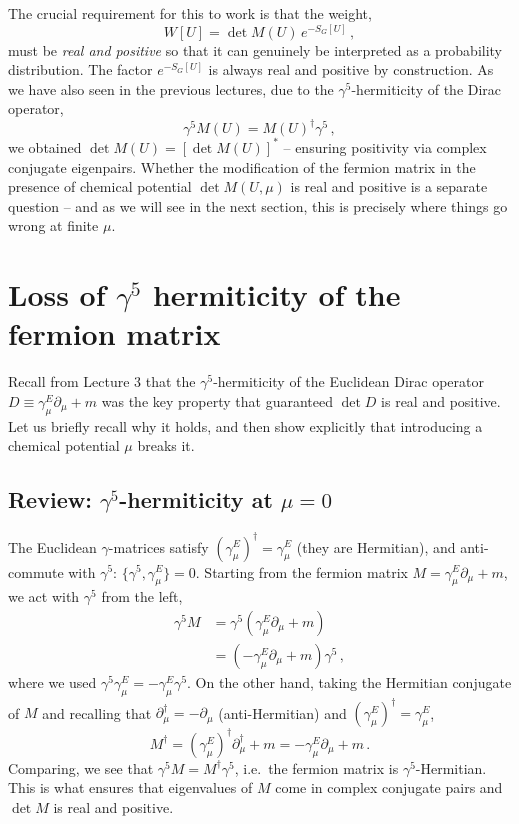 \documentclass[11pt]{article}
\newcommand{\sidefact}[1]{\marginnote{\footnotesize\textcolor{green!50!black}{#1}}}
\theoremstyle{definition}
\begin{document}
The crucial requirement for this to work is that the weight,
\begin{equation}
    W[U] = \det M(U) \, e^{-S_G[U]} \,,
\end{equation}
must be \textit{real and positive} so that it can genuinely be interpreted as a probability distribution. The factor $e^{-S_G[U]}$ is always real and positive by construction. As we have also seen in the previous lectures, due to the $\gamma^5$-hermiticity of the Dirac operator,
\begin{equation}
    \gamma^5 M(U) = M(U)^{\dagger} \gamma^5 \,,
\end{equation}
we obtained $\det M(U) = [\det M(U)]^*$ -- ensuring positivity via complex conjugate eigenpairs.
Whether the modification of the fermion matrix in the presence of chemical potential $\det M(U, \mu)$ is real and positive is a separate question -- and as we will see in the next section, this is precisely where things go wrong at finite $\mu$.

\section{Loss of $\gamma^5$ hermiticity of the fermion matrix}
Recall from Lecture 3 that the $\gamma^5$-hermiticity of the Euclidean Dirac operator $D \equiv \gamma^E_\mu \partial_\mu + m$ was the key property that guaranteed $\det D$ is real and positive. Let us briefly recall why it holds, and then show explicitly that introducing a chemical potential $\mu$ breaks it.

\subsection*{Review: $\gamma^5$-hermiticity at $\mu = 0$}
The Euclidean $\gamma$-matrices satisfy $(\gamma^E_\mu)^\dagger = \gamma^E_\mu$ (they are Hermitian), and \sidefact{Note change of notation from $D \to M$ -- $M[U]$ is the standard notation in lattice literature.}anti-commute with $\gamma^5$: $\{\gamma^5, \gamma^E_\mu\} = 0$. Starting from the fermion matrix $M = \gamma^E_\mu \partial_\mu + m$, we act with $\gamma^5$ from the left,
\begin{align}
    \gamma^5 M &= \gamma^5 \left(\gamma^E_\mu \partial_\mu + m\right) \nonumber \\
               &= \left(-\gamma^E_\mu \partial_\mu + m\right)\gamma^5 \,,
\end{align}
where we used $\gamma^5 \gamma^E_\mu = -\gamma^E_\mu \gamma^5$. On the other hand, taking the Hermitian conjugate of $M$ and recalling that $\partial_\mu^\dagger = -\partial_\mu$ (anti-Hermitian) and $(\gamma^E_\mu)^\dagger = \gamma^E_\mu$,
\begin{equation}
    M^\dagger = (\gamma^E_\mu)^\dagger \partial_\mu^\dagger + m = -\gamma^E_\mu \partial_\mu + m \,.
\end{equation}
Comparing, we see that $\gamma^5 M = M^\dagger \gamma^5$, i.e.\ the fermion matrix is $\gamma^5$-Hermitian. This is what ensures that eigenvalues of $M$ come in complex conjugate pairs and $\det M$ is real and positive.
\end{document}
